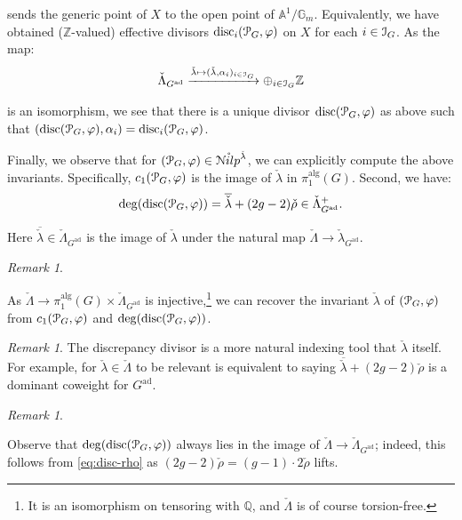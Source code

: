\documentclass[reqno,11pt]{amsart}
\numberwithin{equation}{subsection}
\theoremstyle{remark}
\newtheorem{rem}[thm]{Remark}
\newcommand{\xar}[1]{\xrightarrow{#1}}
\newcommand{\bA}{{\mathbb A}}
\newcommand{\bG}{{\mathbb G}}
\newcommand{\bQ}{{\mathbb Q}}
\newcommand{\bZ}{{\mathbb Z}}
\newcommand{\sI}{{\EuScript I}}
\newcommand{\sN}{{\EuScript N}}
\newcommand{\sP}{{\EuScript P}}
\newcommand{\on}{\operatorname}
\newcommand{\ad}{\on{ad}}
\newcommand{\vph}{\varphi}
\renewcommand{\o}[1]{\mathring{#1}}
\newcommand{\Nilp}{\sN ilp}
\begin{document}
\noindent sends the generic point of $X$ to the open point of $\bA^1/\bG_m$.
Equivalently, we have obtained ($\bZ$-valued) 
effective divisors $\on{disc}_i(\sP_G,\vph)$ on $X$ 
for each $i \in \sI_G$. As 
the map: 
%
\[
\check{\Lambda}_{G^{\ad}} \xar{\check{\lambda} \mapsto 
(\check{\lambda},\alpha_i)_{i \in \sI_G}} \oplus_{i \in \sI_G} \bZ
\]

\noindent is an isomorphism, we see that there is a unique
divisor $\on{disc}(\sP_G,\vph)$ as above
such that $(\on{disc}(\sP_G,\vph),\alpha_i) = \on{disc}_i(\sP_G,\vph)$.

Finally, we observe that for $(\sP_G,\vph) \in \o{\Nilp}^{\check{\lambda}}$,
we can explicitly compute the above invariants. Specifically, 
$c_1(\sP_G,\vph)$ is the image of $\check{\lambda}$ in $\pi_1^{\on{alg}}(G)$.
Second, we have:
%
\begin{equation}\label{eq:disc-rho}
\deg(\on{disc}(\sP_G,\vph)) = \overline{\check{\lambda}} + (2g-2)\check{\rho} \in 
\check{\Lambda}_{G^{\ad}}^+.
\end{equation}

\noindent Here $\overline{\check{\lambda}} \in \check{\Lambda}_{G^{\ad}}$ is the
image of $\check{\lambda}$ under the natural map $\check{\Lambda} \to 
\check{\lambda}_{G^{\ad}}$.

\begin{rem}\label{r:disc-c1}

As $\check{\Lambda} \to \pi_1^{\on{alg}}(G) \times \check{\Lambda}_{G^{\ad}}$
is injective,\footnote{It is an isomorphism on tensoring with $\bQ$, and
$\check{\Lambda}$ is of course torsion-free.} we can recover
the invariant $\check{\lambda}$ of $(\sP_G,\vph)$ from $c_1(\sP_G,\vph)$
and $\deg(\on{disc}(\sP_G,\vph))$.

\end{rem}

\begin{rem}

The discrepancy divisor 
is a more natural indexing tool that $\check{\lambda}$ itself.
For example, for $\check{\lambda} \in \check{\Lambda}$ to be relevant
is equivalent to saying $\overline{\check{\lambda}} + (2g-2)\check{\rho}$
is a dominant coweight for $G^{\ad}$. 

\end{rem}

\begin{rem}\label{r:disc-lifts}

Observe that $\deg(\on{disc}(\sP_G,\vph))$ always lies in the
image of $\check{\Lambda} \to \check{\Lambda}_{G^{\ad}}$;
indeed, this follows from \eqref{eq:disc-rho} as
$(2g-2)\check{\rho} = (g-1)\cdot 2\check{\rho}$ lifts. 

\end{rem}
\end{document}

